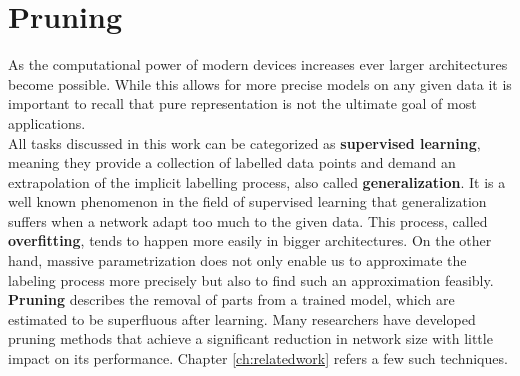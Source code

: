 \section{Pruning}
As the computational power of modern devices increases ever larger architectures become possible. While this allows for more precise models on any given data it is important to recall that pure representation is not the ultimate goal of most applications.\\
All tasks discussed in this work can be categorized as \textbf{supervised learning}, meaning they provide a collection of labelled data points and demand an extrapolation of the implicit labelling process, also called \textbf{generalization}.
It is a well known phenomenon in the field of supervised learning that generalization suffers when a network adapt too much to the given data. This process, called \textbf{overfitting}, tends to happen more easily in bigger architectures. On the other hand, massive parametrization does not only enable us to approximate the labeling process more precisely but also to find such an approximation feasibly.\cite{Overparametrization}\\
\textbf{Pruning} describes the removal of parts from a trained model, which are estimated to be superfluous after learning. Many researchers have developed pruning methods that achieve a significant reduction in network size with little impact on its performance. Chapter \ref{ch:relatedwork} refers a few such techniques.

